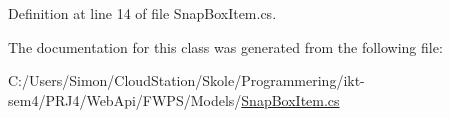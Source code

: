 Definition at line 14 of file Snap\+Box\+Item.\+cs.



The documentation for this class was generated from the following file\+:\begin{DoxyCompactItemize}
\item 
C\+:/\+Users/\+Simon/\+Cloud\+Station/\+Skole/\+Programmering/ikt-\/sem4/\+P\+R\+J4/\+Web\+Api/\+F\+W\+P\+S/\+Models/\mbox{\hyperlink{_web_api_2_f_w_p_s_2_models_2_snap_box_item_8cs}{Snap\+Box\+Item.\+cs}}\end{DoxyCompactItemize}
